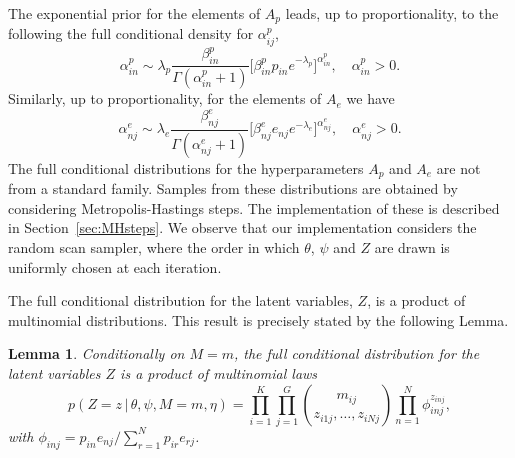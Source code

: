 \documentclass[11pt]{amsart}
\newtheorem{lemma}{Lemma}
\theoremstyle{definition}
\begin{document}
The exponential prior for the elements of $A_p$ leads, up to
proportionality, to the following the full conditional density
for $\alpha_{ij}^p$,
\begin{equation}
 \label{eqn:Full_for_Ap}
  \alpha_{in}^p 
  \sim 
  \lambda_p\frac{\beta_{in}^p}{\Gamma(\alpha_{in}^p + 1)} 
   \Big[\beta_{in}^pp_{in}
   e^{-\lambda_p}\Big]^{\alpha_{in}^p}, \tag{$s_6$}
   \quad  \alpha_{in}^p > 0.
\end{equation}
Similarly, up to proportionality, for the elements of $A_e$ we
have
\begin{equation}
 \label{eqn:Full_for_Ae}
  \alpha_{nj}^e 
  \sim
  \lambda_e\frac{\beta_{nj}^e}{\Gamma(\alpha_{nj}^e + 1)} 
   \Big[\beta_{nj}^e e_{nj}
   e^{-\lambda_e}\Big]^{\alpha_{nj}^e}, 
   \quad  \alpha_{nj}^e > 0. \tag{$s_7$}
\end{equation}
The full conditional distributions for the hyperparameters $A_p$ and
$A_e$ are not from a standard family. Samples from these distributions
are obtained by considering Metropolis-Hastings steps. The
implementation of these is described in Section~\ref{sec:MHsteps}. We
observe that our implementation considers the random scan sampler,
where the order in which $\theta$, $\psi$ and $Z$ are drawn is
uniformly chosen at each iteration.


The full conditional distribution for the latent variables, $Z$, is a
product of multinomial distributions. This result is precisely stated
by the following Lemma. 

\begin{lemma}\label{lem:Full_for_Z} Conditionally on  $M= m$, the full
  conditional distribution for the latent variables $Z$ is a  product
  of multinomial laws 
\[
   p(Z = z\,|\, \theta, \psi, M=m, \eta)
   = 
   \prod_{i=1}^K\prod_{j=1}^G {m_{ij} \choose z_{i1j}, \ldots,
     z_{iNj}} 
   \prod_{n=1}^N \phi_{inj}^{z_{inj}},
\]
with $\phi_{inj} = p_{in} e_{nj}/\sum_{r=1}^N p_{ir}e_{rj}$.
\end{lemma}
\end{document}
